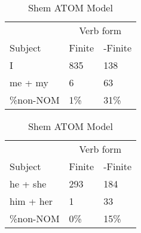 \begin{table}[]
\caption{Shem ATOM Model}
\begin{minipage}{0.5\textwidth}
    \centering
    \begin{tabular}{@{}lll@{}}
        \toprule
         & \multicolumn{2}{c}{Verb form}\\
         \cline{2-3}
        Subject & Finite & -Finite \\
        \midrule
        I & 835 & 138 \\
        me + my & 6 & 63 \\
        \hline
        \%non-NOM & 1\% & 31\% \\
        \bottomrule
    \end{tabular}
\end{minipage}
\begin{minipage}{0.5\textwidth}
    \centering
    \begin{tabular}{@{}lll@{}}
        \toprule
         & \multicolumn{2}{c}{Verb form}\\
         \cline{2-3}
        Subject & Finite & -Finite \\
        \midrule
        he + she & 293 & 184 \\
        him + her & 1 & 33 \\
        \hline
        \%non-NOM & 0\% & 15\% \\
        \bottomrule
    \end{tabular}
    \end{minipage}


\end{table}
